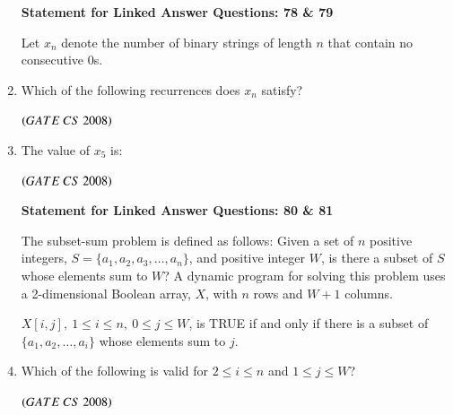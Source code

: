 \documentclass[journal]{IEEEtran}
\numberwithin{equation}{enumi}
\numberwithin{figure}{enumi}
\begin{document}
\begin{enumerate}
\begin{center}
\textbf{Statement for Linked Answer Questions: 78 \& 79}
\end{center}
 
Let $x_n$ denote the number of binary strings of length $n$ that contain no consecutive $0$s.

\item Which of the following recurrences does $x_n$ satisfy? 
\begin{enumerate} 
\end{enumerate}
\hfill $\left(GATE\ CS\  2008\right)$

\item The value of $x_5$ is:
\begin{enumerate} 
\end{enumerate}
\hfill $\left(GATE\ CS\  2008\right)$

\begin{center}
\textbf{Statement for Linked Answer Questions: 80 \& 81}
\end{center}
 
The subset-sum problem is defined as follows: Given a set of $n$ positive integers, $S = \{a_1, a_2, a_3, \dots, a_n\}$, and positive integer $W$, is there a subset of $S$ whose elements sum to $W$? A dynamic program for solving this problem uses a 2-dimensional Boolean array, $X$, with $n$ rows and $W+1$ columns.

$X[i, j], \ 1 \leq i \leq n, \ 0 \leq j \leq W$, is TRUE if and only if there is a subset of $\{a_1, a_2, \dots, a_i\}$ whose elements sum to $j$.
 

\item Which of the following is valid for $2 \leq i \leq n$ and $1 \leq j \leq W$? 
\begin{enumerate} 
\end{enumerate}
\hfill $\left(GATE\ CS\  2008\right)$


\end{enumerate}
\end{document}
